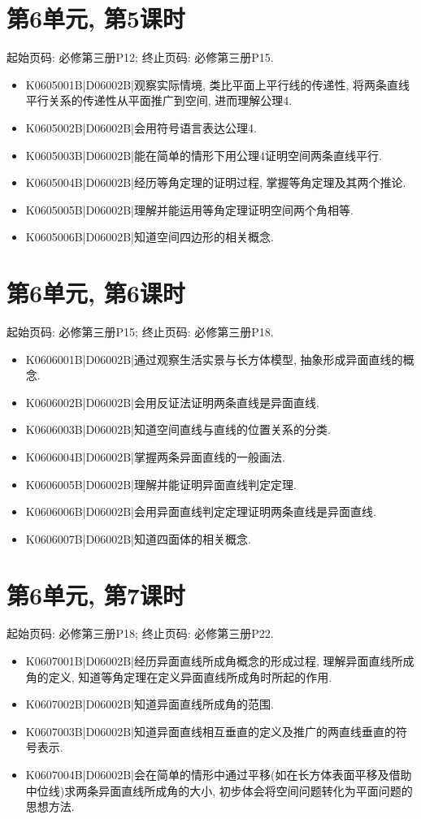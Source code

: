 \section*{第6单元, 第5课时}
起始页码: 必修第三册P12; 终止页码: 必修第三册P15.
\begin{itemize}
\item K0605001B|D06002B|观察实际情境, 类比平面上平行线的传递性, 将两条直线平行关系的传递性从平面推广到空间, 进而理解公理4.
\item K0605002B|D06002B|会用符号语言表达公理4.
\item K0605003B|D06002B|能在简单的情形下用公理4证明空间两条直线平行.
\item K0605004B|D06002B|经历等角定理的证明过程, 掌握等角定理及其两个推论.
\item K0605005B|D06002B|理解并能运用等角定理证明空间两个角相等.
\item K0605006B|D06002B|知道空间四边形的相关概念.
\end{itemize}

\section*{第6单元, 第6课时}
起始页码: 必修第三册P15; 终止页码: 必修第三册P18.
\begin{itemize}
\item K0606001B|D06002B|通过观察生活实景与长方体模型, 抽象形成异面直线的概念.
\item K0606002B|D06002B|会用反证法证明两条直线是异面直线.
\item K0606003B|D06002B|知道空间直线与直线的位置关系的分类.
\item K0606004B|D06002B|掌握两条异面直线的一般画法.
\item K0606005B|D06002B|理解并能证明异面直线判定定理.
\item K0606006B|D06002B|会用异面直线判定定理证明两条直线是异面直线.
\item K0606007B|D06002B|知道四面体的相关概念.
\end{itemize}

\section*{第6单元, 第7课时}
起始页码: 必修第三册P18; 终止页码: 必修第三册P22.
\begin{itemize}
\item K0607001B|D06002B|经历异面直线所成角概念的形成过程, 理解异面直线所成角的定义, 知道等角定理在定义异面直线所成角时所起的作用.
\item K0607002B|D06002B|知道异面直线所成角的范围.
\item K0607003B|D06002B|知道异面直线相互垂直的定义及推广的两直线垂直的符号表示.
\item K0607004B|D06002B|会在简单的情形中通过平移(如在长方体表面平移及借助中位线)求两条异面直线所成角的大小, 初步体会将空间问题转化为平面问题的思想方法.
\end{itemize}

